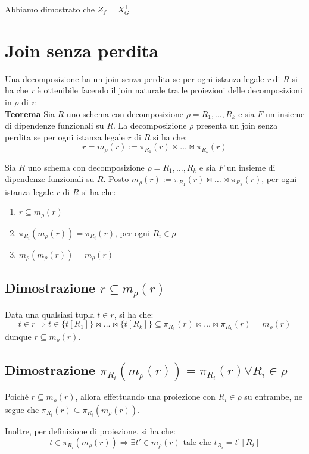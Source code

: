 \documentclass{article}
\begin{document}
Abbiamo dimostrato che \textbf{$Z_f = X_G^+$}
\pagebreak


\section{Join senza perdita}
Una decomposizione ha un join senza perdita se per ogni istanza legale \textit{r} di $R$ si ha che \textit{r} è ottenibile facendo il join naturale tra le proiezioni delle decomposizioni in $\rho$ di \textit{r}.
\\

\textbf{Teorema}
Sia $R$ uno schema con decomposizione $\rho = R_1, \ldots, R_k$ e sia $F$ un insieme di dipendenze funzionali su $R$. La decomposizione $\rho$ presenta un join senza perdita se per ogni istanza legale $r$ di $R$ si ha che:
\[ r = m_{\rho}(r) := \pi_{R_1}(r) \bowtie \ldots \bowtie \pi_{R_k}(r) \]

Sia $R$ uno schema con decomposizione $\rho = R_1, \ldots, R_k$ e sia $F$ un insieme di dipendenze funzionali su $R$. Posto $m_{\rho}(r) := \pi_{R_1}(r) \bowtie \ldots \bowtie \pi_{R_k}(r)$, per ogni istanza legale $r$ di $R$ si ha che:

\begin{enumerate}
  \item $r \subseteq m_{\rho}(r)$
  \item $\pi_{R_i}(m_{\rho}(r)) = \pi_{R_i}(r)$, per ogni $R_i \in \rho$
  \item $m_{\rho}(m_{\rho}(r)) = m_{\rho}(r)$
\end{enumerate}
\subsection{Dimostrazione $r \subseteq m_{\rho}(r)$}
Data una qualsiasi tupla $t \in r$, si ha che:
\[ t \in r \Rightarrow t \in \{t[R_1]\} \bowtie \ldots \bowtie \{t[R_k]\} \subseteq \pi_{R_1}(r) \bowtie \ldots \bowtie \pi_{R_k}(r) = m_{\rho}(r) \]
dunque $r \subseteq m_{\rho}(r)$.
\subsection{Dimostrazione  $\pi_{R_i}(m_{\rho}(r)) = \pi_{R_i}(r) \forall R_i \in \rho$}

Poiché $r \subseteq m_{\rho}(r)$, allora effettuando una proiezione con $R_i \in \rho$ su entrambe, ne segue che $\pi_{R_i}(r) \subseteq \pi_{R_i}(m_{\rho}(r))$.

Inoltre, per definizione di proiezione, si ha che:
\[ t \in \pi_{R_i}(m_{\rho}(r)) \Rightarrow \exists t' \in m_{\rho}(r) \text{ tale che } t_{R_i} = t^{'}[R_i] \]
\end{document}
